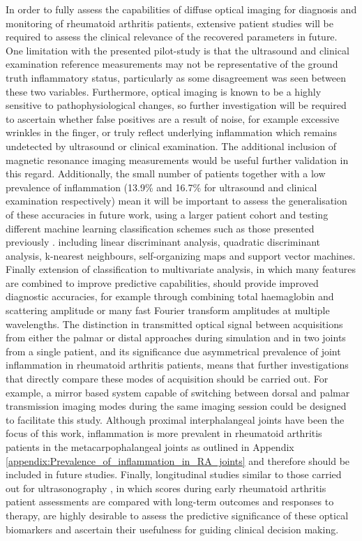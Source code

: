 \documentclass[twoside]{bhamthesis}
\theoremstyle{definition}
\begin{document}
In order to fully assess the capabilities of diffuse optical imaging for diagnosis and monitoring of rheumatoid arthritis patients, extensive patient studies will be required to assess the clinical relevance of the recovered parameters in future. One limitation with the presented pilot-study is that the ultrasound and clinical examination reference measurements may not be representative of the ground truth inflammatory status, particularly as some disagreement was seen between these two variables. Furthermore, optical imaging is known to be a highly sensitive to pathophysiological changes, so further investigation will be required to ascertain whether false positives are a result of noise, for example excessive wrinkles in the finger, or truly reflect underlying inflammation which remains undetected by ultrasound or clinical examination. The additional inclusion of magnetic resonance imaging measurements would be useful further validation in this regard. Additionally, the small number of patients together with a low prevalence of inflammation (13.9\% and 16.7\% for ultrasound and clinical examination respectively) mean it will be important to assess the generalisation of these accuracies in future work, using a larger patient cohort and testing different machine learning classification schemes such as those presented previously \cite{montejo2013computer2,schwaighofer2003classification}. 
including linear discriminant analysis, quadratic discriminant analysis, k-nearest neighbours, self-organizing maps and support vector machines. Finally extension of classification to multivariate analysis, in which many features are combined to improve predictive capabilities, should provide improved diagnostic accuracies, for example through combining total haemaglobin and scattering amplitude or many fast Fourier transform amplitudes at multiple wavelengths. The distinction in transmitted optical signal between acquisitions from either the palmar or distal approaches during simulation and in two joints from a single patient, and its significance due asymmetrical prevalence of joint inflammation in rheumatoid arthritis patients, means that further investigations that directly compare these modes of acquisition should be carried out. For example, a mirror based system capable of switching between dorsal and palmar transmission imaging modes during the same imaging session could be designed to facilitate this study. Although proximal interphalangeal joints have been the focus of this work, inflammation is more prevalent in rheumatoid arthritis patients in the metacarpophalangeal joints as outlined in Appendix \ref{appendix:Prevalence_of_inflammation_in_RA_joints} and therefore should be included in future studies. Finally, longitudinal studies similar to those carried out for ultrasonography \cite{filer2011utility}, in which scores during early rheumatoid arthritis patient assessments are compared with long-term outcomes and responses to therapy, are highly desirable to assess the predictive significance of these optical biomarkers and ascertain their usefulness for guiding clinical decision making. 
\end{document}
